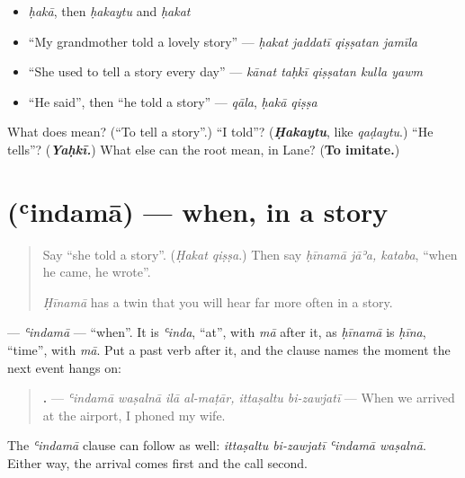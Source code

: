 \begin{itemize}
\raggedright
  \item \emph{ḥakā}, then \emph{ḥakaytu} and \emph{ḥakat}
  \item \textquotedblleft{}My grandmother told a lovely story\textquotedblright{} — \emph{ḥakat jaddatī qiṣṣatan jamīla}
  \item \textquotedblleft{}She used to tell a story every day\textquotedblright{} — \emph{kānat taḥkī qiṣṣatan kulla yawm}
  \item \textquotedblleft{}He said\textquotedblright{}, then \textquotedblleft{}he told a story\textquotedblright{} — \emph{qāla}, \emph{ḥakā qiṣṣa}
\end{itemize}

\begin{tcolorbox}[breakable,colback=teal!4,colframe=teal!35!black,title={Before you move on}]
What does  mean? (\textquotedblleft{}To tell a story\textquotedblright{}.) \textquotedblleft{}I told\textquotedblright{}? (\emph{\textbf{Ḥakaytu}}, like \emph{qaḍaytu}.) \textquotedblleft{}He tells\textquotedblright{}? (\emph{\textbf{Yaḥkī.}}) What else can the root mean, in Lane? (\textbf{To imitate.})
\end{tcolorbox}
\section[\texorpdfstring{\ar{عندما} (ʿindamā)}{عندما (ʿindamā)}]{ (ʿindamā) — when, in a story}

\label{lesson:AR-C284-indama}



\begin{quote}
Say \textquotedblleft{}she told a story\textquotedblright{}. (\emph{Ḥakat qiṣṣa}.) Then say \emph{ḥīnamā jāʾa, kataba}, \textquotedblleft{}when he came, he wrote\textquotedblright{}.

\emph{Ḥīnamā} has a twin that you will hear far more often in a story.
\end{quote}

\begin{grammarlens}[title={Grammar Lens: ʿindamā and the past}]
\textbf{} — \emph{ʿindamā} — \textquotedblleft{}when\textquotedblright{}. It is \emph{ʿinda}, \textquotedblleft{}at\textquotedblright{}, with \emph{mā} after it, as \emph{ḥīnamā} is \emph{ḥīna}, \textquotedblleft{}time\textquotedblright{}, with \emph{mā}. Put a past verb after it, and the clause names the moment the next event hangs on:

\begin{quote}
\textbf{     .} — \emph{ʿindamā waṣalnā ilā al-maṭār, ittaṣaltu bi-zawjatī} — When we arrived at the airport, I phoned my wife.
\end{quote}

The \emph{ʿindamā} clause can follow as well: \emph{ittaṣaltu bi-zawjatī ʿindamā waṣalnā}. Either way, the arrival comes first and the call second.
\end{grammarlens}

